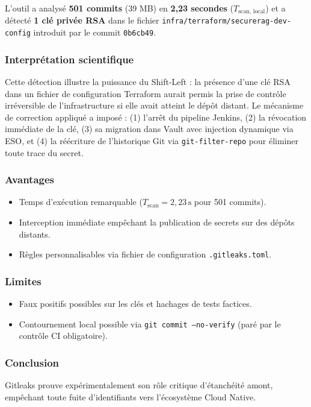 L'outil a analysé \textbf{501 commits} (39 MB) en \textbf{2,23 secondes} ($T_{\text{scan, local}}$) et a détecté \textbf{1 clé privée RSA} dans le fichier \texttt{infra/terraform/securerag-dev-config} introduit par le commit \texttt{0b6cb49}.

\subsubsection{Interprétation scientifique}
Cette détection illustre la puissance du Shift-Left : la présence d'une clé RSA dans un fichier de configuration Terraform aurait permis la prise de contrôle irréversible de l'infrastructure si elle avait atteint le dépôt distant. Le mécanisme de correction appliqué a imposé : (1) l'arrêt du pipeline Jenkins, (2) la révocation immédiate de la clé, (3) sa migration dans Vault avec injection dynamique via ESO, et (4) la réécriture de l'historique Git via \texttt{git-filter-repo} pour éliminer toute trace du secret.

\subsubsection{Avantages}
\begin{itemize}
    \item Temps d'exécution remarquable ($T_{\text{scan}} = 2{,}23\,\text{s}$ pour 501 commits).
    \item Interception immédiate empêchant la publication de secrets sur des dépôts distants.
    \item Règles personnalisables via fichier de configuration \texttt{.gitleaks.toml}.
\end{itemize}

\subsubsection{Limites}
\begin{itemize}
    \item Faux positifs possibles sur les clés et hachages de tests factices.
    \item Contournement local possible via \texttt{git commit --no-verify} (paré par le contrôle CI obligatoire).
\end{itemize}

\subsubsection{Conclusion}
Gitleaks prouve expérimentalement son rôle critique d'étanchéité amont, empêchant toute fuite d'identifiants vers l'écosystème Cloud Native.

